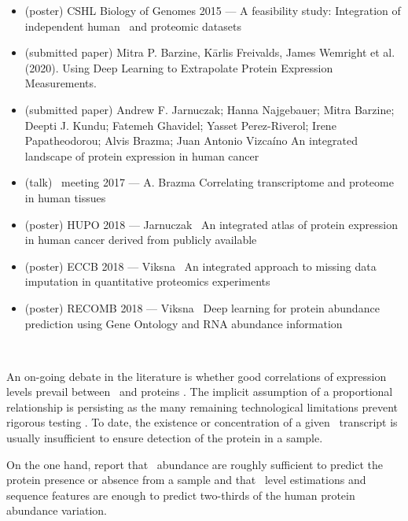 \clearpage
\derivativeWork{}
\begin{itemize}[topsep=0pt,nosep]
    \item (poster) CSHL  Biology of Genomes 2015 --- A feasibility study:
        Integration of independent human \Rnaseq\ and proteomic datasets
    \item (submitted paper) Mitra P. Barzine, K\={a}rlis Freivalds, James Wemright et al. (2020).
        Using Deep Learning to Extrapolate Protein Expression Measurements.
    \item (submitted paper) Andrew F. Jarnuczak; Hanna Najgebauer; Mitra Barzine;
        Deepti J. Kundu; Fatemeh Ghavidel; Yasset Perez-Riverol; Irene Papatheodorou; Alvis Brazma;
        Juan Antonio Vizcaíno An integrated landscape of protein expression in human cancer
    \item (talk) \gtex\ meeting 2017 --- A. Brazma Correlating transcriptome
        and proteome in human tissues
    \item (poster) HUPO 2018 --- Jarnuczak \etal\ An integrated atlas of
        protein expression in human cancer derived from publicly available
    \item (poster) ECCB 2018 --- Viksna \etal\ An integrated approach
        to missing data imputation in quantitative proteomics experiments
    \item (poster) RECOMB 2018 --- Viksna \etal\ Deep learning
        for protein abundance prediction using Gene Ontology and RNA abundance information
\end{itemize}

\clearpage\


An on-going debate in the literature is
whether good correlations of expression levels prevail
between \mRNAs\ and proteins .
The implicit assumption of a proportional relationship is persisting
as the many remaining technological limitations prevent
rigorous testing .
To date, the existence or concentration of a given \mRNA\ transcript
is usually insufficient to ensure detection of the protein in a sample.\mybr\

On the one hand,
\citet{Ramakrishnan2009-lv} report that
\mRNAs\ abundance are roughly sufficient to predict
the protein presence or absence from a sample and
\citet{Vogel2010-ux} that
\mRNA\ level estimations and sequence features are enough to predict
two-thirds of the human protein abundance variation.\mybr\

